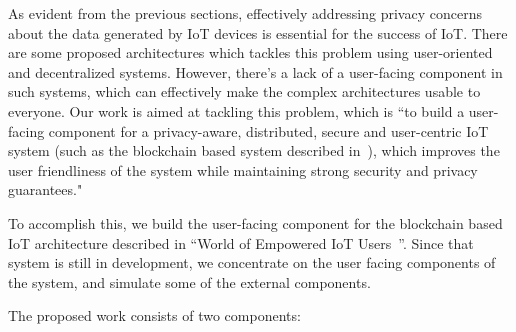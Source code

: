 As evident from the previous sections, effectively addressing privacy concerns about the data generated by IoT devices is essential for the success of IoT. There are some proposed architectures which tackles this problem using user-oriented and decentralized systems. However, there's a lack of a user-facing component in such systems, which can effectively make the complex architectures usable to everyone. Our work is aimed at tackling this problem, which is ``to build a user-facing component for a privacy-aware, distributed, secure and user-centric IoT system (such as the blockchain based system described in~\cite{campbell}), which improves the user friendliness of the system while maintaining strong security and privacy guarantees."

To accomplish this, we build the user-facing component for the blockchain based IoT architecture described in ``World of Empowered IoT Users~\cite{campbell}''. Since that system is still in development, we concentrate on the user facing components of the system, and simulate some of the external components.

The proposed work consists of two components:

